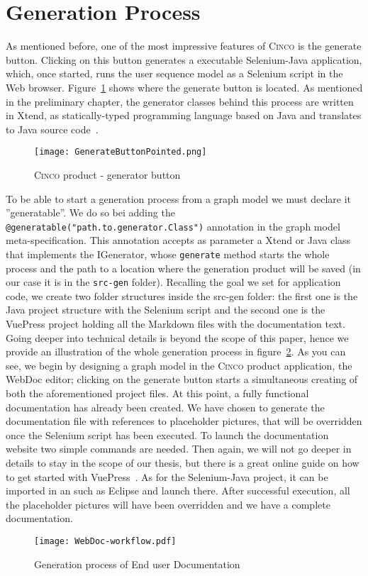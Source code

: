 \section{Generation Process}\label{sec:GenProcess}

As mentioned before, one of the most impressive features of \textsc{Cinco} is the generate button. Clicking on this button generates a executable Selenium-Java application, which, once started, runs the user sequence model  as a Selenium script in the Web browser. Figure~\ref{fig:genButton} shows where the generate button is located. As mentioned in the preliminary chapter, the generator classes behind this process are written in Xtend, as statically-typed programming language based on Java and translates to Java source code~\cite{Xtend}. 

\begin{figure}[H]
    \centering
    \texttt{[image: GenerateButtonPointed.png]}
    \caption{\textsc{Cinco} product - generator button}
    \label{fig:genButton}
\end{figure}

To be able to start a generation process from a graph model we must declare it ''generatable''. We do so bei adding the \lstinline[language=MGL]{@generatable("path.to.generator.Class")} annotation in the graph model meta-specification. This annotation accepts as parameter a Xtend or Java class that implements the IGenerator, whose \lstinline{generate} method starts the whole process and the path to a location where the generation product will be saved (in our case it is in the \lstinline{src-gen} folder). Recalling the goal we set for application code, we create two folder structures inside the src-gen folder: the first one is the Java project structure with the Selenium script and the second one is the VuePress project holding all the Markdown files with the documentation text. Going deeper into technical details is beyond the scope of this paper, hence we provide an illustration of the whole generation process in figure~\ref{fig:WebDocWorkflow}. As you can see, we begin by designing a graph model in the \textsc{Cinco} product application, the WebDoc editor; clicking on the generate button starts a simultaneous creating of both the aforementioned project files. At this point, a fully functional documentation has already been created. We have chosen to generate the documentation file with references to placeholder pictures, that will be overridden once the Selenium script has been executed. To launch the documentation website two simple commands are needed. Then again, we will not go deeper in details to stay in the scope of our thesis, but there is a great online guide on how to get started with VuePress~\cite{vuepress}. As for the Selenium-Java project, it can be imported in an  such as Eclipse and launch there. After successful execution, all the placeholder pictures will have been overridden and we have a complete documentation.

\begin{figure}[t]
    \centering
    \texttt{[image: WebDoc-workflow.pdf]}
    \caption{Generation process of End user Documentation}
    \label{fig:WebDocWorkflow}
\end{figure}